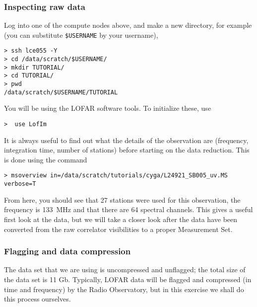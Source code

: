 
\subsubsection{Inspecting raw data}

Log into one of the compute nodes above, and make a new directory, for example (you can substitute \texttt{\$USERNAME} by your username),
\begin{verbatim}
> ssh lce055 -Y
> cd /data/scratch/$USERNAME/
> mkdir TUTORIAL/
> cd TUTORIAL/
> pwd
/data/scratch/$USERNAME/TUTORIAL
\end{verbatim}

You will be using the LOFAR software tools. To initialize these, use
\begin{verbatim}
>  use LofIm
\end{verbatim}

It is always useful to find out what the details of the observation are (frequency, integration time, number of stations) before starting on the data reduction. This is done using the command
\begin{verbatim}
> msoverview in=/data/scratch/tutorials/cyga/L24921_SB005_uv.MS verbose=T  
\end{verbatim}

From here, you should see that 27 stations were used for this observation, the frequency is 133~MHz and that there are 64 spectral channels. This gives a useful first look at the data, but we will take a closer look after the data have been converted from the raw correlator visibilities to a proper Measurement Set.


\subsubsection{Flagging and data compression}

The data set that we are using is uncompressed and unflagged; the total size of the data set is 11 Gb. Typically, LOFAR data will be flagged and compressed (in time and frequency) by the Radio Observatory, but in this exercise we shall do this process ourselves.

